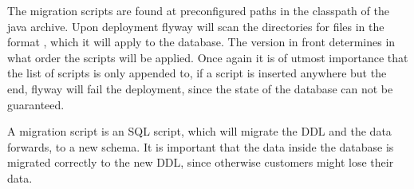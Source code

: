 The migration scripts are found at preconfigured paths in the classpath of the java archive.
Upon deployment flyway will scan the directories for files in the format , which it will apply to the database.
The version in front determines in what order the scripts will be applied.
Once again it is of utmost importance that the list of scripts is only appended to, if a script is inserted anywhere but the end, flyway will fail the deployment, since the state of the database can not be guaranteed.

A migration script is an SQL script, which will migrate the \ac{DDL} and the data forwards, to a new schema.
It is important that the data inside the database is migrated correctly to the new \ac{DDL}, since otherwise customers might lose their data.
